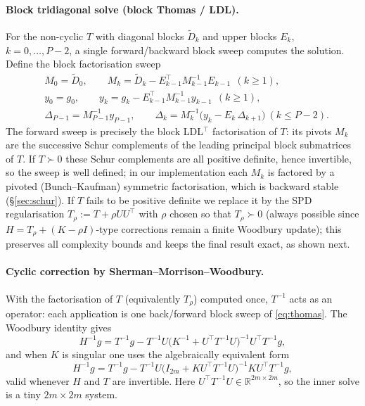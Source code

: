 \documentclass{amsart}
\newcommand{\R}{\mathbb{R}}
\begin{document}
\paragraph{Block tridiagonal solve (block Thomas / LDL).}
For the non-cyclic $T$ with diagonal blocks $\widetilde D_k$ and upper blocks $E_k$,
$k=0,\dots,P-2$, a single forward/backward block sweep computes the solution. Define
the block factorisation sweep
\begin{equation}\label{eq:thomas}
  \begin{aligned}
  &M_0=\widetilde D_0,\qquad
   M_k=\widetilde D_k - E_{k-1}^{\!\top}M_{k-1}^{-1}E_{k-1}\ \ (k\ge1),\\
  &y_0=g_0,\qquad y_k=g_k-E_{k-1}^{\!\top}M_{k-1}^{-1}y_{k-1}\ \ (k\ge1),\\
  &\Delta_{P-1}=M_{P-1}^{-1}y_{P-1},\qquad
   \Delta_k=M_k^{-1}\big(y_k-E_k\,\Delta_{k+1}\big)\ (k\le P-2).
  \end{aligned}
\end{equation}
The forward sweep is precisely the block LDL$^{\!\top}$ factorisation of $T$: its
pivots $M_k$ are the successive Schur complements of the leading principal block
submatrices of $T$. If $T\succ0$ these Schur complements are all positive definite,
hence invertible, so the sweep is well defined; in our implementation each $M_k$ is
factored by a pivoted (Bunch--Kaufman) symmetric factorisation, which is backward
stable (\S\ref{sec:schur}). If $T$ fails to be positive definite we replace it by
the SPD regularisation $T_\rho:=T+\rho U U^{\!\top}$ with $\rho$ chosen so that
$T_\rho\succ0$ (always possible since $H=T_\rho+(K-\rho I)$-type corrections remain a
finite Woodbury update); this preserves all complexity bounds and keeps the final
result exact, as shown next.

\paragraph{Cyclic correction by Sherman--Morrison--Woodbury.}
With the factorisation of $T$ (equivalently $T_\rho$) computed once, $T^{-1}$ acts as
an operator: each application is one back/forward block sweep of \eqref{eq:thomas}.
The Woodbury identity gives
\begin{equation}\label{eq:woodbury}
  H^{-1}g
   = T^{-1}g - T^{-1}U\big(K^{-1}+U^{\!\top}T^{-1}U\big)^{-1}U^{\!\top}T^{-1}g ,
\end{equation}
and when $K$ is singular one uses the algebraically equivalent form
\begin{equation}\label{eq:woodbury2}
  H^{-1}g
   = T^{-1}g - T^{-1}U\big(I_{2m}+KU^{\!\top}T^{-1}U\big)^{-1}KU^{\!\top}T^{-1}g ,
\end{equation}
valid whenever $H$ and $T$ are invertible. Here $U^{\!\top}T^{-1}U\in\R^{2m\times2m}$,
so the inner solve is a tiny $2m\times2m$ system.
\end{document}

